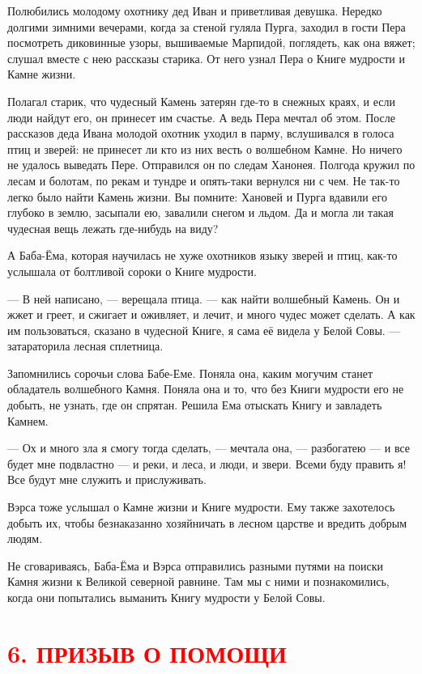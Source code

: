 \documentclass[oneside,final,14pt]{extreport}
\begin{document}
	Полюбились молодому охотнику дед Иван и приветливая девушка. Нередко долгими зимними вечерами, когда за стеной гуляла Пурга, заходил в гости Пера посмотреть диковинные узоры, вышиваемые Марпидой, поглядеть, как она вяжет; слушал вместе с нею рассказы старика. От него узнал Пера о Книге мудрости и Камне жизни.
	
	Полагал старик, что чудесный Камень затерян где-то в снежных краях, и если люди найдут его, он принесет им счастье. А ведь Пера мечтал об этом. После рассказов деда Ивана молодой охотник уходил в парму, вслушивался в голоса птиц и зверей: не принесет ли кто из них весть о волшебном Камне. Но ничего не удалось выведать Пере. Отправился он по следам Ханонея. Полгода кружил по лесам и болотам, по рекам и тундре и опять-таки вернулся ни с чем. Не так-то легко было найти Камень жизни. Вы помните: Хановей и Пурга вдавили его глубоко в землю, засыпали ею, завалили снегом и льдом. Да и могла ли такая чудесная вещь лежать где-нибудь на виду?
	
	А Баба-Ёма, которая научилась не хуже охотников языку зверей и птиц, как-то услышала от болтливой сороки о Книге мудрости.
	
	— В ней написано, — верещала птица. — как найти волшебный Камень. Он и жжет и греет, и сжигает и оживляет, и лечит, и много чудес может сделать. А как им пользоваться, сказано в чудесной Книге, я сама её видела у Белой Совы. — затараторила лесная сплетница.
	
	Запомнились сорочьи слова Бабе-Еме. Поняла она, каким могучим станет обладатель волшебного Камня. Поняла она и то, что без Книги мудрости его не добыть, не узнать, где он спрятан. Решила Ема отыскать Книгу и завладеть Камнем.
	
	— Ох и много зла я смогу тогда сделать, — мечтала она, — разбогатею — и все будет мне подвластно — и реки, и леса, и люди, и звери. Всеми буду править я! Все будут мне служить и прислуживать.
	
	Вэрса тоже услышал о Камне жизни и Книге мудрости. Ему также захотелось добыть их, чтобы безнаказанно хозяйничать в лесном царстве и вредить добрым людям.
	
	Не сговариваясь, Баба-Ёма и Вэрса отправились разными путями на поиски Камня жизни к Великой северной равнине. Там мы с ними и познакомились, когда они попытались выманить Книгу мудрости у Белой Совы.
	
	\section[6. Призыв о помощи]{\center \textcolor{red}{6. ПРИЗЫВ О ПОМОЩИ}}
	
\end{document}
